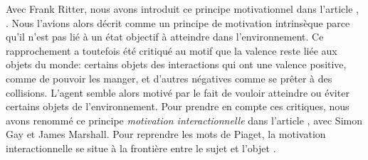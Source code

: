  




Avec Frank Ritter, nous avons introduit ce principe motivationnel dans l'article , \cite{georgeon_intrinsically-motivated_2012}.
Nous l'avions alors décrit comme un principe de motivation intrinsèque parce qu'il n'est pas lié à un état objectif à atteindre dans l'environnement. 
Ce rapprochement a toutefois été critiqué au motif que la valence reste liée aux objets du monde: certains objets  des interactions qui ont une valence positive, comme de pouvoir les manger, et d'autres négatives comme se prêter à des collisions. 
L'agent semble alors motivé par le fait de vouloir atteindre ou éviter certains objets de l'environnement.
Pour prendre en compte ces critiques, nous avons renommé ce principe \emph{motivation interactionnelle} dans l'article , \cite{georgeon_interactional_2012} avec Simon Gay et James Marshall.
Pour reprendre les mots de Piaget, la motivation interactionnelle se situe \og à la frontière entre le sujet et l'objet \fg.

